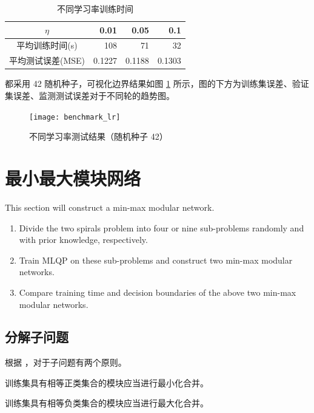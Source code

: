     \begin{table}[H]
        \centering
        \caption{不同学习率训练时间}\label{tab:benchmark_lr}
        \begin{tabular}{crrr}
            \toprule
            $\eta$ & 0.01 & 0.05 & 0.1 \\
            \midrule
            平均训练时间(s) & 108 & 71 & 32 \\
            平均测试误差(MSE) & 0.1227 & 0.1188 & 0.1303 \\
            \bottomrule
        \end{tabular}
    \end{table}

    都采用 42 随机种子，可视化边界结果如图 \ref{fig:benchmark_lr} 所示，图的下方为训练集误差、验证集误差、监测测试误差对于不同轮的趋势图。

    \begin{figure}[H]
        \centering
        \texttt{[image: benchmark\_lr]}
        \caption{不同学习率测试结果（随机种子 42）}\label{fig:benchmark_lr}
    \end{figure}

    \section{最小最大模块网络}

    \begin{problem}
        This section will construct a min-max modular network.
        \begin{enumerate}
            \item Divide the two spirals problem into four or nine sub-problems randomly and with prior knowledge, respectively.
            \item Train MLQP on these sub-problems and construct two min-max modular networks.
            \item Compare training time and decision boundaries of the above two min-max modular networks.
        \end{enumerate}
    \end{problem}

    \subsection{分解子问题}

    根据 \cite{minmax}，对于子问题有两个原则。
    \begin{lemma}[最小化原则]\label{lemma:min}
        训练集具有相等正类集合的模块应当进行最小化合并。
    \end{lemma}
    \begin{lemma}[最大化原则]\label{lemma:max}
        训练集具有相等负类集合的模块应当进行最大化合并。
    \end{lemma}

